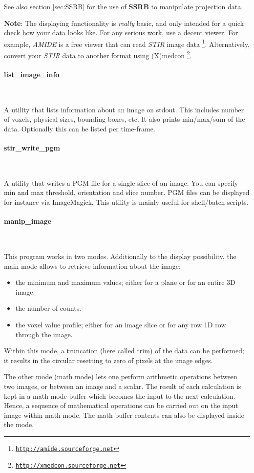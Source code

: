 \documentclass{article}
\def\url#1#2{\mbox{\href{#1}{\tt #2}}}
\newcommand{\subsubsubsection}[1]{\paragraph{#1}\mbox{} \\}
\begin{document}
See also section \ref{sec:SSRB} for the use of \textbf{SSRB} to manipulate projection 
data.

\textbf{Note}: The displaying functionality is \textit{really} basic, and 
only intended for a quick check how your data looks like. For 
any serious work, use a decent viewer. For example, \textit{AMIDE} 
is a free viewer that can read \textit{STIR} image data
\footnote{\url{http://amide.sourceforge.net }{http://amide.sourceforge.net}}. Alternatively, 
convert your \textit{STIR} data to another format using (X)medcon
\footnote{\url{http://xmedcon.sourceforge.net }{http://xmedcon.sourceforge.net}}.

{ \subsubsubsection{list\_image\_info}
}

A utility that lists information about an image on stdout. This includes number of voxels,
physical sizes, bounding boxes, etc. It also prints min/max/sum of the data. 
Optionally this can be listed per time-frame.

{ \subsubsubsection{stir\_write\_pgm}
}

A utility that writes a PGM file for a single slice of an image. You can specify min and max threshold,
orientation and slice number. PGM files can be displayed for instance via ImageMagick.
This utility is mainly useful for shell/batch scripts.

{ \subsubsubsection{manip\_image}
}

This program works in two modes. Additionally to the display 
possibility, the main mode allows to retrieve information about 
the image:

\begin{itemize}
\item the minimum and maximum values; either for a plane or for an 
entire 3D image.
\item the number of counts.
\item the voxel value profile; either for an image slice or for any 
row 1D row through the image.
\end{itemize}
Within this mode, a truncation (here called trim) of the data 
can be performed; it results in the circular resetting to zero 
of pixels at the image edges.


The other mode (math mode) lets one perform arithmetic operations 
between two images, or between an image and a scalar. The result 
of each calculation is kept in a math mode buffer which becomes 
the input to the next calculation. Hence, a sequence of mathematical 
operations can be carried out on the input image within math 
mode. The math buffer contents can also be displayed inside the 
mode.
\end{document}
